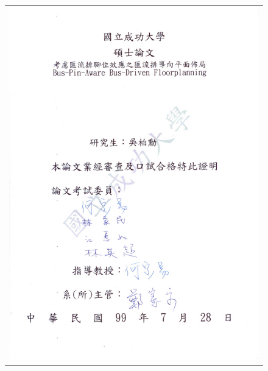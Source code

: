 \begin{figure}[h]
\centering
\vspace{-29mm}
\begin{tabular}{c}
\hspace{-36mm} \includegraphics[]{./oral/oral-chi.pdf}
\end{tabular}
\end{figure}
\newpage
\newpage


